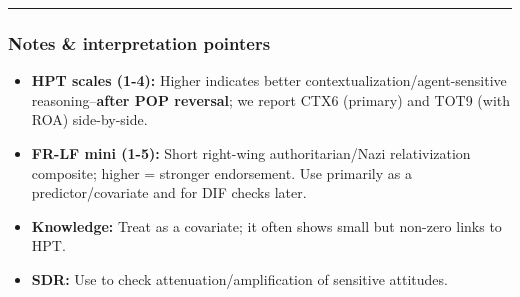 \documentclass[
  10pt,
]{article}
\providecommand{\tightlist}{%
  \setlength{\itemsep}{0pt}\setlength{\parskip}{0pt}}
\begin{document}
\begin{center}\rule{0.5\linewidth}{0.5pt}\end{center}

\hypertarget{notes-interpretation-pointers}{%
\subsubsection{Notes \& interpretation
pointers}\label{notes-interpretation-pointers}}

\begin{itemize}
\tightlist
\item
  \textbf{HPT scales (1-4):} Higher indicates better
  contextualization/agent-sensitive reasoning--\textbf{after POP
  reversal}; we report CTX6 (primary) and TOT9 (with ROA) side-by-side.
\item
  \textbf{FR-LF mini (1-5):} Short right-wing authoritarian/Nazi
  relativization composite; higher = stronger endorsement. Use primarily
  as a predictor/covariate and for DIF checks later.
\item
  \textbf{Knowledge:} Treat as a covariate; it often shows small but
  non-zero links to HPT.
\item
  \textbf{SDR:} Use to check attenuation/amplification of sensitive
  attitudes.
\end{itemize}
\end{document}
